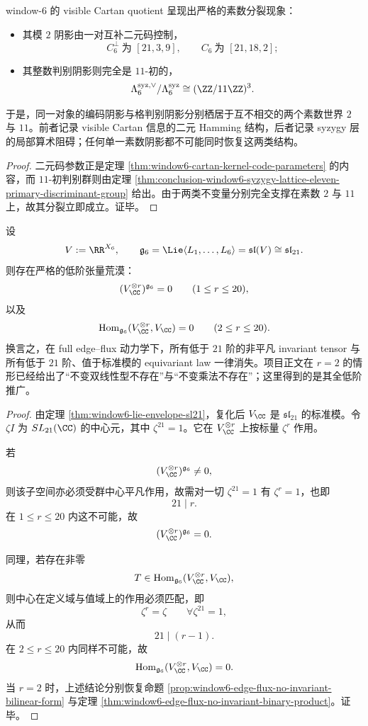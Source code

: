 \begin{corollary}\label{cor:conclusion-window6-code-discriminant-prime-splitting}
window-\(6\) 的 visible Cartan quotient 呈现出严格的素数分裂现象：
\begin{itemize}
  \item 其模 \(2\) 阴影由一对互补二元码控制，
  \[
  C_6^\perp\ \text{为 }[21,3,9],
  \qquad
  C_6\ \text{为 }[21,18,2];
  \]
  \item 其整数判别阴影则完全是 \(11\)-初的，
  \[
  \Lambda_6^{\mathrm{syz},\vee}/\Lambda_6^{\mathrm{syz}}
  \cong
  (\ZZ/11\ZZ)^3.
  \]
\end{itemize}
于是，同一对象的编码阴影与格判别阴影分别栖居于互不相交的两个素数世界 \(2\) 与 \(11\)。前者记录 visible Cartan 信息的二元 Hamming 结构，后者记录 syzygy 层的局部算术阻碍；任何单一素数阴影都不可能同时恢复这两类结构。
\end{corollary}
\begin{proof}
二元码参数正是定理 \ref{thm:window6-cartan-kernel-code-parameters} 的内容，而 \(11\)-初判别群则由定理 \ref{thm:conclusion-window6-syzygy-lattice-eleven-primary-discriminant-group} 给出。由于两类不变量分别完全支撑在素数 \(2\) 与 \(11\) 上，故其分裂立即成立。证毕。
\end{proof}

\begin{theorem}\label{thm:conclusion-window6-low-order-tensor-vacuum}
设
\[
V:=\RR^{X_6},
\qquad
\mathfrak g_6=\Lie\langle L_1,\dots,L_6\rangle=\mathfrak{sl}(V)\cong \mathfrak{sl}_{21}.
\]
则存在严格的低阶张量荒漠：
\[
(V_{\CC}^{\otimes r})^{\mathfrak g_6}=0
\qquad
(1\le r\le 20),
\]
以及
\[
\operatorname{Hom}_{\mathfrak g_6}(V_{\CC}^{\otimes r},V_{\CC})=0
\qquad
(2\le r\le 20).
\]
换言之，在 full edge--flux 动力学下，所有低于 \(21\) 阶的非平凡 invariant tensor 与所有低于 \(21\) 阶、值于标准模的 equivariant law 一律消失。项目正文在 \(r=2\) 的情形已经给出了“不变双线性型不存在”与“不变乘法不存在”；这里得到的是其全低阶推广。
\end{theorem}
\begin{proof}
由定理 \ref{thm:window6-lie-envelope-sl21}，复化后 \(V_{\CC}\) 是 \(\mathfrak{sl}_{21}\) 的标准模。令 \(\zeta I\) 为 \(SL_{21}(\CC)\) 的中心元，其中 \(\zeta^{21}=1\)。它在 \(V_{\CC}^{\otimes r}\) 上按标量 \(\zeta^r\) 作用。

若
\[
(V_{\CC}^{\otimes r})^{\mathfrak g_6}\neq 0,
\]
则该子空间亦必须受群中心平凡作用，故需对一切 \(\zeta^{21}=1\) 有 \(\zeta^r=1\)，也即
\[
21\mid r.
\]
在 \(1\le r\le 20\) 内这不可能，故
\[
(V_{\CC}^{\otimes r})^{\mathfrak g_6}=0.
\]

同理，若存在非零
\[
T\in \operatorname{Hom}_{\mathfrak g_6}(V_{\CC}^{\otimes r},V_{\CC}),
\]
则中心在定义域与值域上的作用必须匹配，即
\[
\zeta^r=\zeta
\qquad
\forall \zeta^{21}=1,
\]
从而
\[
21\mid (r-1).
\]
在 \(2\le r\le 20\) 内同样不可能，故
\[
\operatorname{Hom}_{\mathfrak g_6}(V_{\CC}^{\otimes r},V_{\CC})=0.
\]
当 \(r=2\) 时，上述结论分别恢复命题 \ref{prop:window6-edge-flux-no-invariant-bilinear-form} 与定理 \ref{thm:window6-edge-flux-no-invariant-binary-product}。证毕。
\end{proof}


